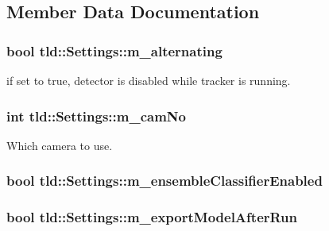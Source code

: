 \subsection{Member Data Documentation}
\hypertarget{classtld_1_1_settings_ae4a5b3fb575a1a49823f8305f3aefded}{
\subsubsection[{m\_\-alternating}]{\setlength{\rightskip}{0pt plus 5cm}bool {\bf tld::Settings::m\_\-alternating}}}
\label{classtld_1_1_settings_ae4a5b3fb575a1a49823f8305f3aefded}


if set to true, detector is disabled while tracker is running. 

\hypertarget{classtld_1_1_settings_a01db1115a98b15abdab2c03cdacadfdd}{
\subsubsection[{m\_\-camNo}]{\setlength{\rightskip}{0pt plus 5cm}int {\bf tld::Settings::m\_\-camNo}}}
\label{classtld_1_1_settings_a01db1115a98b15abdab2c03cdacadfdd}


Which camera to use. 

\hypertarget{classtld_1_1_settings_af184f95560d875d91951dbbc368ba04d}{
\subsubsection[{m\_\-ensembleClassifierEnabled}]{\setlength{\rightskip}{0pt plus 5cm}bool {\bf tld::Settings::m\_\-ensembleClassifierEnabled}}}
\label{classtld_1_1_settings_af184f95560d875d91951dbbc368ba04d}
\hypertarget{classtld_1_1_settings_a5d0b425a526e5f7f78c758bfde3d9ee9}{
\subsubsection[{m\_\-exportModelAfterRun}]{\setlength{\rightskip}{0pt plus 5cm}bool {\bf tld::Settings::m\_\-exportModelAfterRun}}}
\label{classtld_1_1_settings_a5d0b425a526e5f7f78c758bfde3d9ee9}



